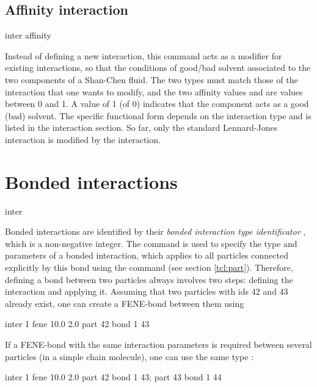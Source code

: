 \subsection{Affinity interaction}
\label{sec:affinity}

\begin{essyntax}
  inter  
  affinity
    
  \begin{features}
  \end{features}
\end{essyntax}

Instead of defining a new interaction, this command acts as a
modifier for existing interactions, so that the conditions of
good/bad solvent associated to the two components of a Shan-Chen
fluid. The two types must match those of the interaction that one
wants to modify, and the two affinity values  and
 are values between 0 and 1. A value of 1 (of 0)
indicates that the component acts as a good (bad) solvent. The
specific functional form depends on the interaction type and is
listed in the interaction section.  So far, only the standard
Lennard-Jones interaction is modified by the 
interaction.



\section{Bonded interactions}
\label{sec:inter-bonded}

\begin{essyntax*}
  inter 
\end{essyntax*}

 Bonded interactions are identified
by their \emph{bonded interaction type identificator} ,
which is a non-negative integer.  The   command
is used to specify the type and parameters of a bonded interaction,
which applies to all particles connected explicitly by this bond
using the  command (see section \vref{tcl:part}).
Therefore, defining a bond between two particles always involves two
steps: defining the interaction and applying it. Assuming that two
particles with ids 42 and 43 already exist, one can create \eg a
FENE-bond between them using
\begin{tclcode}
  inter 1 fene 10.0 2.0
  part 42 bond 1 43
\end{tclcode}
If a FENE-bond with the same interaction parameters is required between several
particles (\eg in a simple chain molecule), one can use the same type :
\begin{tclcode}
  inter 1 fene 10.0 2.0
  part 42 bond 1 43; part 43 bond 1 44 
\end{tclcode}

